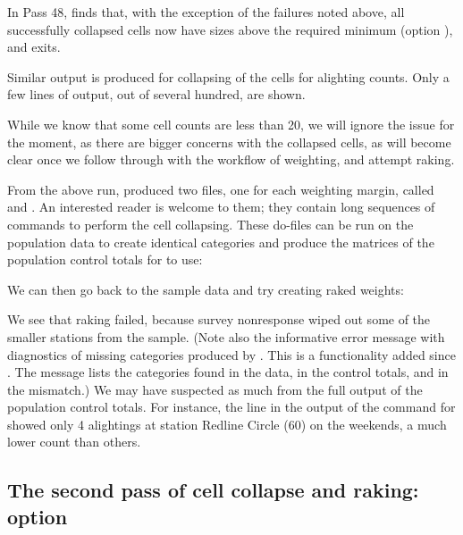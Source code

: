 In Pass 48,  finds that, with the exception of the failures noted above,
all successfully collapsed cells now have sizes above the required minimum (option ),
and exits.

Similar output is produced for collapsing of the cells for alighting counts. Only a few lines
of output, out of several hundred, are shown.

While we know that some cell counts are less than 20, we will ignore the issue
for the moment, as there are bigger concerns with the collapsed cells,
as will become clear once we follow through with the workflow of weighting,
and attempt raking.

From the above run,  produced two files, one for each
weighting margin, called  and . An interested reader
is welcome to  them; they contain long sequences of 
commands to perform the cell collapsing. These do-files
can be run on the population data to create identical categories and produce
the matrices of the population control totals for  to use:

\noindent
\begin{stlog}
\nullskip
\end{stlog}

\bigskip

We can then go back to the sample data and try creating raked weights:

\begin{stlog}
\nullskip
\end{stlog}

We see that raking failed, because survey nonresponse wiped out some of the smaller
stations from the sample. (Note also the informative error message with
diagnostics of missing categories produced by . This is a functionality
added since \citet{kolenikov:2014}. The message lists
the categories found in the data, in the control totals, and in the mismatch.)
We may have suspected
as much from the full output of the population control totals. For instance,
the line in the output of the  command
for  showed only 4 alightings at station Redline Circle (60)
on the weekends, a much lower count than others.

\subsection{The second pass of cell collapse and raking:  option}

